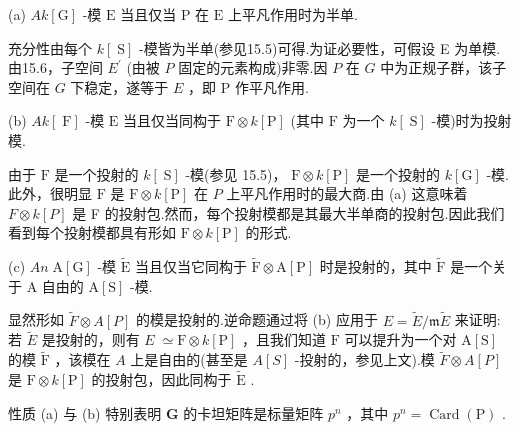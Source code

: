 \documentclass[10pt]{article}
\begin{document}
(a) \({Ak}\left\lbrack  \mathrm{G}\right\rbrack\) -模 \(\mathrm{E}\) 当且仅当 \(\mathrm{P}\) 在 \(\mathrm{E}\) 上平凡作用时为半单.

充分性由每个 \(k\left\lbrack  \mathrm{\;S}\right\rbrack\) -模皆为半单(参见15.5)可得.为证必要性，可假设 E 为单模.由15.6，子空间 \({E}^{\prime }\) (由被 \(P\) 固定的元素构成)非零.因 \(P\) 在 \(G\) 中为正规子群，该子空间在 \(G\) 下稳定，遂等于 \(E\) ，即 \(\mathrm{P}\) 作平凡作用.

(b) \({Ak}\left\lbrack  \mathrm{\;F}\right\rbrack\) -模 \(\mathrm{E}\) 当且仅当同构于 \(\mathrm{F} \otimes  k\left\lbrack  \mathrm{P}\right\rbrack\) (其中 \(\mathrm{F}\) 为一个 \(k\left\lbrack  \mathrm{\;S}\right\rbrack\) -模)时为投射模.

由于 \(\mathrm{F}\) 是一个投射的 \(k\left\lbrack  \mathrm{\;S}\right\rbrack\) -模(参见 15.5)， \(\mathrm{F} \otimes  k\left\lbrack  \mathrm{P}\right\rbrack\) 是一个投射的 \(k\left\lbrack  \mathrm{G}\right\rbrack\) -模.此外，很明显 \(\mathrm{F}\) 是 \(\mathrm{F} \otimes  k\left\lbrack  \mathrm{P}\right\rbrack\) 在 \(P\) 上平凡作用时的最大商.由 (a) 这意味着 \(F \otimes  k\left\lbrack  P\right\rbrack\) 是 F 的投射包.然而，每个投射模都是其最大半单商的投射包.因此我们看到每个投射模都具有形如 \(\mathrm{F} \otimes  k\left\lbrack  \mathrm{P}\right\rbrack\) 的形式.

(c) \({An}\mathrm{\;A}\left\lbrack  \mathrm{G}\right\rbrack\) -模 \(\widetilde{\mathrm{E}}\) 当且仅当它同构于 \(\widetilde{\mathrm{F}} \otimes  \mathrm{A}\left\lbrack  \mathrm{P}\right\rbrack\) 时是投射的，其中 \(\widetilde{\mathrm{F}}\) 是一个关于 A 自由的 \(\mathrm{A}\left\lbrack  \mathrm{S}\right\rbrack\) -模.

显然形如 \(\widetilde{F} \otimes  A\left\lbrack  P\right\rbrack\) 的模是投射的.逆命题通过将 (b) 应用于 \(E = \widetilde{E}/\mathfrak{m}\widetilde{E}\) 来证明:若 \(\widetilde{E}\) 是投射的，则有 \(E \; \simeq  \mathrm{F} \otimes  k\left\lbrack  \mathrm{P}\right\rbrack\) ，且我们知道 \(\mathrm{F}\) 可以提升为一个对 \(\mathrm{A}\left\lbrack  \mathrm{S}\right\rbrack\) 的模 \(\widetilde{\mathrm{F}}\) ，该模在 \(A\) 上是自由的(甚至是 \(A\left\lbrack  S\right\rbrack\) -投射的，参见上文).模 \(\widetilde{F} \otimes  A\left\lbrack  P\right\rbrack\) 是 \(\mathrm{F} \otimes  k\left\lbrack  \mathrm{P}\right\rbrack\) 的投射包，因此同构于 \(\widetilde{\mathrm{E}}\) .

性质 (a) 与 (b) 特别表明 \(\mathbf{G}\) 的卡坦矩阵是标量矩阵 \({p}^{n}\) ，其中 \({p}^{n} = \operatorname{Card}\left( \mathrm{P}\right)\) .
\end{document}
